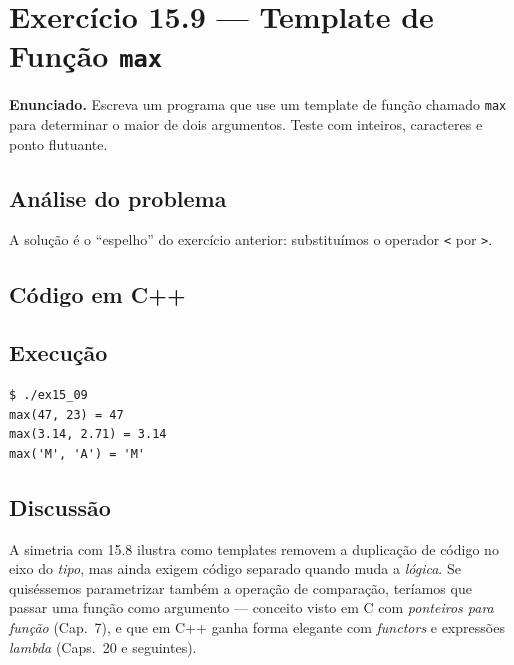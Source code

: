 \documentclass[11pt,a4paper]{article}
\begin{document}
\section{Exerc\'icio 15.9 --- Template de Fun\c{c}\~ao \texttt{max}}

\begin{enunciado}
\textbf{Enunciado.} Escreva um programa que use um template de fun\c{c}\~ao chamado \texttt{max} para determinar o maior de dois argumentos. Teste com inteiros, caracteres e ponto flutuante.
\end{enunciado}

\subsection*{An\'alise do problema}

A solu\c{c}\~ao \'e o ``espelho'' do exerc\'icio anterior: substitu\'imos o operador \texttt{<} por \texttt{>}.

\subsection*{C\'odigo em C++}



\subsection*{Execu\c{c}\~ao}

\begin{saidabox}
\begin{lstlisting}[style=terminal]
$ ./ex15_09
max(47, 23) = 47
max(3.14, 2.71) = 3.14
max('M', 'A') = 'M'
\end{lstlisting}
\end{saidabox}

\subsection*{Discuss\~ao}

A simetria com 15.8 ilustra como templates removem a duplica\c{c}\~ao de c\'odigo no eixo do \emph{tipo}, mas ainda exigem c\'odigo separado quando muda a \emph{l\'ogica}. Se quis\'essemos parametrizar tamb\'em a opera\c{c}\~ao de compara\c{c}\~ao, ter\'iamos que passar uma fun\c{c}\~ao como argumento --- conceito visto em C com \emph{ponteiros para fun\c{c}\~ao} (Cap.~7), e que em C++ ganha forma elegante com \emph{functors} e express\~oes \emph{lambda} (Caps.~20 e seguintes).
\end{document}
